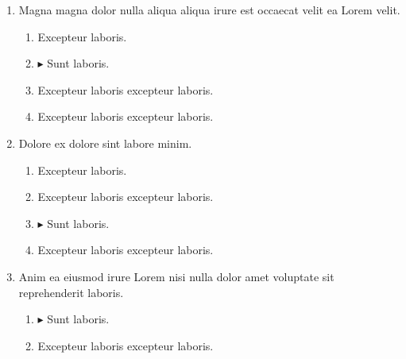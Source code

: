\documentclass[a4paper,12pt]{article}
\begin{document}
\begin{enumerate}[label=\textbf{\arabic*.}]
\begin{multicols}{2}
\begin{enumerate}
		\item  Excepteur laboris excepteur laboris.
  
		\item  Excepteur laboris.
    
	\end{enumerate}

\end{multicols}
\item Magna magna dolor nulla aliqua aliqua irure est occaecat velit ea Lorem velit.
\begin{multicols}{2}
	\begin{enumerate}
		\item  Excepteur laboris.
    
		\item $\blacktriangleright$  Sunt laboris.
    
		\item  Excepteur laboris excepteur laboris.
    
		\item  Excepteur laboris excepteur laboris.
  
	\end{enumerate}

\end{multicols}
\item Dolore ex dolore sint labore minim.
\begin{multicols}{2}
	\begin{enumerate}
		\item  Excepteur laboris.
    
		\item  Excepteur laboris excepteur laboris.
    
		\item $\blacktriangleright$  Sunt laboris.
    
		\item  Excepteur laboris excepteur laboris.
  
	\end{enumerate}

\end{multicols}
\item Anim ea eiusmod irure Lorem nisi nulla dolor amet voluptate sit reprehenderit laboris.
\begin{multicols}{2}
	\begin{enumerate}
		\item $\blacktriangleright$  Sunt laboris.
    
		\item  Excepteur laboris excepteur laboris.
  

\end{enumerate}
\end{multicols}
\end{enumerate}
\end{document}
